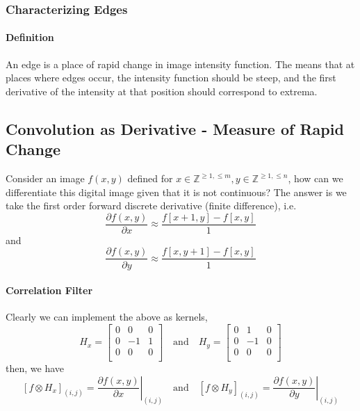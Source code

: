 \documentclass[11pt]{article}
\begin{document}
\subsubsection{Characterizing Edges}
\paragraph{Definition} An edge is a place of rapid change in image intensity function. The means that at places where edges occur, the intensity function should be steep, and the first derivative of the intensity at that position should correspond to extrema. 

\subsection{Convolution as Derivative - Measure of Rapid Change}
Consider an image $f(x, y)$ defined for $x\in \mathbb Z ^{\geq 1, \leq m}, y \in \mathbb Z ^{\geq 1 , \leq n}$, how can we differentiate this digital image given that it is not continuous? The answer is we take the first order forward discrete derivative (finite difference), i.e. 
\begin{equation}
\frac{\partial f(x, y)}{\partial x} \approx \frac{f[x+1, y] - f[x, y]}{1}
\end{equation}
and
\begin{equation}
\frac{\partial f(x, y)}{\partial y} \approx \frac{f[x, y + 1] - f[x, y]}{1}
\end{equation}

\paragraph{Correlation Filter}
Clearly we can implement the above as kernels, 
\begin{equation}
H_x = \begin{bmatrix}
	0 & 0 & 0 \\	
	0 & -1 & 1 \\
	0 & 0 & 0 \\
\end{bmatrix} \quad \text{and} \quad H_y = \begin{bmatrix}
	0 & 1 & 0 \\	
	0 & -1 & 0 \\
	0 & 0 & 0 \\
\end{bmatrix}
\end{equation}
then, we have
\begin{equation}
\left[ f \otimes H_x \right]_{(i, j)} = \left. \frac{\partial f(x, y)}{\partial x}\right|_{(i, j)} 
\quad \text{and} \quad 
\left[ f \otimes H_y \right]_{(i, j)} = \left. \frac{\partial f(x, y)}{\partial y}\right|_{(i, j)} 
\end{equation}
\end{document}
